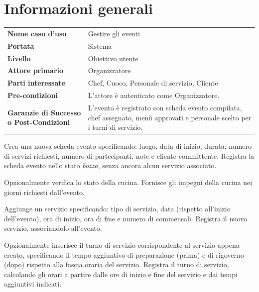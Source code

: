 
\section*{Informazioni generali}

\renewcommand{\arraystretch}{1.4}
\begin{tabular}{L{4.5cm} L{9.5cm}}
\toprule
\textbf{Nome caso d'uso}             & Gestire gli eventi \\
\textbf{Portata}                     & Sistema \\
\textbf{Livello}                     & Obiettivo utente \\
\textbf{Attore primario}             & Organizzatore \\
\textbf{Parti interessate}           & Chef, Cuoco, Personale di servizio, Cliente \\
\midrule
\textbf{Pre-condizioni}              & L'attore è autenticato come Organizzatore. \\
\textbf{Garanzie di Successo o Post-Condizioni} & L'evento è registrato con scheda evento
                                       compilata, chef assegnato, menù approvati
                                       e personale scelto per i turni di servizio. \\
\bottomrule
\end{tabular}
\renewcommand{\arraystretch}{1.0}


\uctablebegin
    {Crea una nuova scheda evento specificando: luogo, data di inizio, durata, numero
    di servizi richiesti, numero di partecipanti, note e cliente committente.}
    {Registra la scheda evento nello stato \emph{bozza}, senza ancora
     alcun servizio associato.}

    {Opzionalmente verifica lo stato della cucina.}
    {Fornisce gli impegni della cucina nei giorni richiesti dall'evento.}

    {Aggiunge un servizio specificando: tipo di servizio, data (rispetto
     all'inizio dell'evento), ora di inizio, ora di fine e numero di
     commensali.}
    {Registra il nuovo servizio, associandolo all'evento.}

    {Opzionalmente inserisce il turno di servizio corrispondente al
     servizio appena creato, specificando il tempo aggiuntivo di
     preparazione (prima) e di rigoverno (dopo) rispetto alla fascia
     oraria del servizio.}
    {Registra il turno di servizio, calcolando gli orari a partire
     dalle ore di inizio e fine del servizio e dai tempi aggiuntivi
     indicati.}


